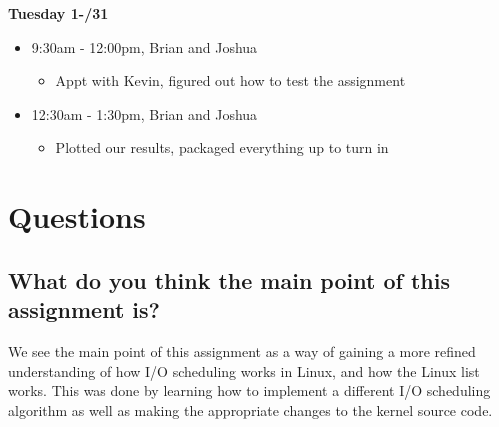 \documentclass[letterpaper, onecolumn, draftclsnofoot, 10pt, compsoc]{IEEEtran}
\begin{document}
\begin{singlespace}
                    
        \textbf{Tuesday 1-/31}
            \begin{itemize}
                \item 9:30am - 12:00pm, Brian and Joshua
                    \begin{itemize}
                        \item Appt with Kevin, figured out how to test the assignment
                    \end{itemize}
                 \item 12:30am - 1:30pm, Brian and Joshua
                    \begin{itemize}
                        \item Plotted our results, packaged everything up to turn in
                    \end{itemize}
            \end{itemize}
    \end{singlespace}
        
\section{Questions}
    
    \subsection{What do you think the main point of this assignment is?}
        \begin{singlespace}
            We see the main point of this assignment as a way of gaining a more refined understanding of how I/O scheduling works in Linux, and how the Linux list works. This was done by learning how to implement a different I/O scheduling algorithm as well as making the appropriate changes to the kernel source code. 
        \end{singlespace}
    
\end{document}
